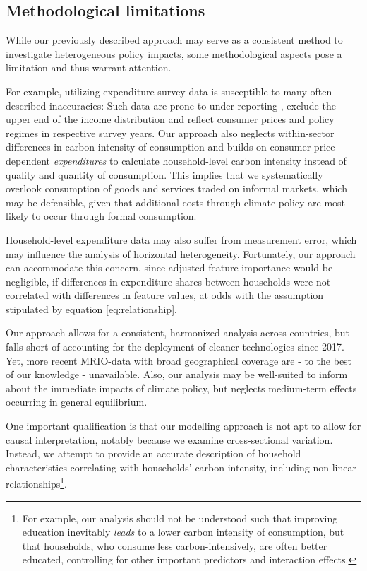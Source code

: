 \documentclass[12pt, a4paper]{article}
\begin{document}
\subsection{Methodological limitations}

While our previously described approach may serve as a consistent method to investigate heterogeneous policy impacts, some methodological aspects pose a limitation and thus warrant attention.

For example, utilizing expenditure survey data is susceptible to many often-described inaccuracies: Such data are prone to under-reporting \autocite{Meyer.2015}, exclude the upper end of the income distribution \autocite{Blanchet.2022} and reflect consumer prices and policy regimes in respective survey years. Our approach also neglects within-sector differences in carbon intensity of consumption and builds on consumer-price-dependent \textit{expenditures} to calculate household-level carbon intensity instead of quality and quantity of consumption. This implies that we systematically overlook consumption of goods and services traded on informal markets, which may be defensible, given that additional costs through climate policy are most likely to occur through formal consumption.

Household-level expenditure data may also suffer from measurement error, which may influence the analysis of horizontal heterogeneity. Fortunately, our approach can accommodate this concern, since adjusted feature importance would be negligible, if differences in expenditure shares between households were not correlated with differences in feature values, at odds with the assumption stipulated by equation \ref{eq:relationship}.

Our approach allows for a consistent, harmonized analysis across countries, but falls short of accounting for the deployment of cleaner technologies since 2017. Yet, more recent MRIO-data with broad geographical coverage are - to the best of our knowledge - unavailable. Also, our analysis may be well-suited to inform about the immediate impacts of climate policy, but neglects medium-term effects occurring in general equilibrium. 

One important qualification is that our modelling approach is not apt to allow for causal interpretation, notably because we examine cross-sectional variation. Instead, we attempt to provide an accurate description of household characteristics correlating with households' carbon intensity, including non-linear relationships\footnote{For example, our analysis should not be understood such that improving education inevitably \textit{leads} to a lower carbon intensity of consumption, but that households, who consume less carbon-intensively, are often better educated, controlling for other important predictors and interaction effects.}.
\end{document}
